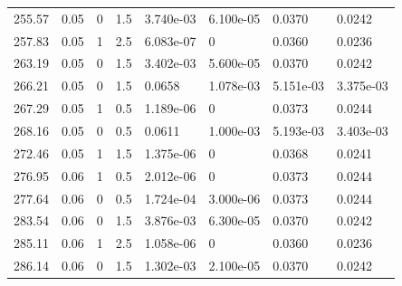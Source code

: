 \documentclass[preview]{standalone}
\begin{document}
{{{\begin{tabular}{L{1.2cm}C{1.2cm} C{0.3cm}C{0.5cm} C{1.4cm}C{1.4cm} C{1.4cm}C{1.4cm}}
  255.57  &  0.05  & 0     & 1.5 &  3.740e-03  & 6.100e-05  & 0.0370 &  0.0242   \\ 
  257.83  &  0.05  & 1     & 2.5 &  6.083e-07  & 0  & 0.0360 &  0.0236   \\ 
  263.19  &  0.05  & 0     & 1.5 &  3.402e-03  & 5.600e-05  & 0.0370 &  0.0242   \\ 
  266.21  &  0.05  & 0     & 1.5 &  0.0658  & 1.078e-03  & 5.151e-03 &  3.375e-03   \\ 
  267.29  &  0.05  & 1     & 0.5 &  1.189e-06  & 0  & 0.0373 &  0.0244   \\ 
  268.16  &  0.05  & 0     & 0.5 &  0.0611  & 1.000e-03  & 5.193e-03 &  3.403e-03   \\ 
  272.46  &  0.05  & 1     & 1.5 &  1.375e-06  & 0  & 0.0368 &  0.0241   \\ 
  276.95  &  0.06  & 1     & 0.5 &  2.012e-06  & 0  & 0.0373 &  0.0244   \\ 
  277.64  &  0.06  & 0     & 0.5 &  1.724e-04  & 3.000e-06  & 0.0373 &  0.0244   \\ 
  283.54  &  0.06  & 0     & 1.5 &  3.876e-03  & 6.300e-05  & 0.0370 &  0.0242   \\ 
  285.11  &  0.06  & 1     & 2.5 &  1.058e-06  & 0  & 0.0360 &  0.0236   \\ 
  286.14  &  0.06  & 0     & 1.5 &  1.302e-03  & 2.100e-05  & 0.0370 &  0.0242   \\ 
\hline 
\end{tabular} 

}}}
\end{document}
